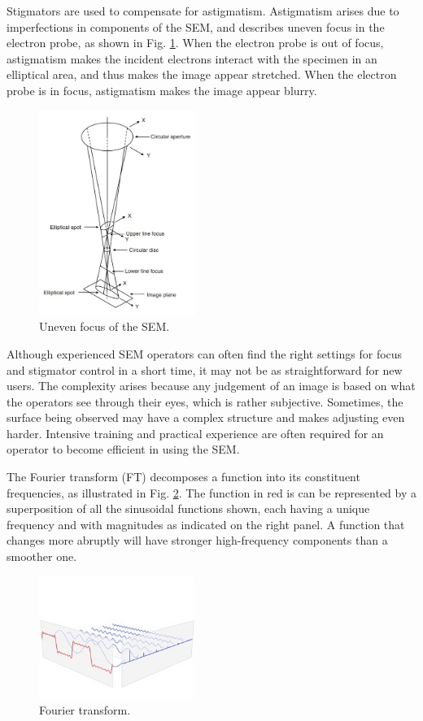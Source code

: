 \documentclass[12pt, conference]{IEEEtran}
\begin{document}
Stigmators are used to compensate for astigmatism. Astigmatism arises due to imperfections in components of the SEM, and describes uneven focus in the electron probe, as shown in Fig. \ref{SEM uneven focus}. When the electron probe is out of focus, astigmatism makes the incident electrons interact with the specimen in an elliptical area, and thus makes the image appear stretched. When the electron probe is in focus, astigmatism makes the image appear blurry.

\begin{figure}[htbp]
    \centering
    \includegraphics[width=0.45\textwidth]{Images/SEM uneven focus.jpg}
    \caption{Uneven focus of the SEM.}
    \label{SEM uneven focus}
\end{figure}

Although experienced SEM operators can often find the right settings for focus and stigmator control in a short time, it may not be as straightforward for new users. The complexity arises because any judgement of an image is based on what the operators see through their eyes, which is rather subjective. Sometimes, the surface being observed may have a complex structure and makes adjusting even harder. Intensive training and practical experience are often required for an operator to become efficient in using the SEM.

The Fourier transform (FT) decomposes a function into its constituent frequencies, as illustrated in Fig. \ref{FT}. The function in red is can be represented by a superposition of all the sinusoidal functions shown, each having a unique frequency and with magnitudes as indicated on the right panel. A function that changes more abruptly will have stronger high-frequency components than a smoother one. 

\begin{figure}[htbp]
    \centering
    \includegraphics[width=0.45\textwidth]{Images/FT.jpg}
    \caption{Fourier transform.}
    \label{FT}
\end{figure}
\end{document}
